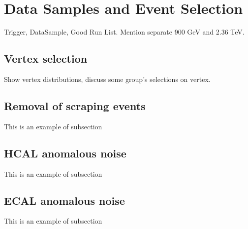 \documentclass{cmspaper}
\begin{document}
\section{Data Samples and Event Selection}

Trigger, DataSample, Good Run List. Mention separate 900 GeV and 2.36
TeV. 

\subsection{Vertex selection}
Show vertex distributions, discuss some group's selections on vertex.

\subsection{Removal of scraping events}
This is an example of subsection

\subsection{HCAL anomalous noise}

This is an example of subsection

\subsection{ECAL anomalous noise}

This is an example of subsection
\end{document}
